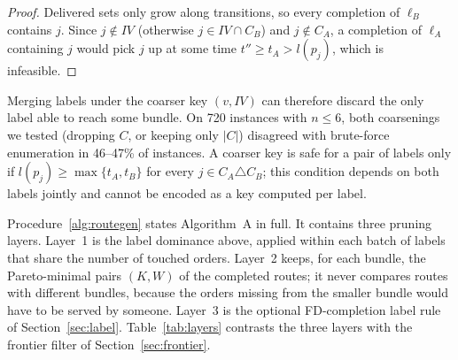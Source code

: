 \documentclass[review,12pt]{elsarticle}
\theoremstyle{definition}
\theoremstyle{remark}
\begin{document}
\begin{proof}
Delivered sets only grow along transitions, so every completion of
$\ell_B$ contains $j$. Since $j\notin IV$ (otherwise $j\in IV\cap C_B$) and
$j\notin C_A$, a completion of $\ell_A$ containing $j$ would pick $j$ up at
some time $t''\ge t_A>l(p_j)$, which is infeasible.
\end{proof}

Merging labels under the coarser key $(v,IV)$ can therefore discard the only
label able to reach some bundle. On 720 instances with $n\le 6$, both
coarsenings we tested (dropping $C$, or keeping only $|C|$) disagreed with
brute-force enumeration in 46--47\% of instances. A coarser key is safe for
a pair of labels only if $l(p_j)\ge\max\{t_A,t_B\}$ for every
$j\in C_A\triangle C_B$; this condition depends on both labels jointly and
cannot be encoded as a key computed per label.

Procedure~\ref{alg:routegen} states Algorithm~A in full. It contains three
pruning layers. Layer~1 is the label dominance above, applied within each
batch of labels that share the number of touched orders. Layer~2 keeps, for
each bundle, the Pareto-minimal pairs $(K,W)$ of the completed routes; it
never compares routes with different bundles, because the orders missing from
the smaller bundle would have to be served by someone. Layer~3 is the
optional FD-completion label rule of Section~\ref{sec:label}. Table~\ref{tab:layers}
contrasts the three layers with the frontier filter of
Section~\ref{sec:frontier}.
\end{document}

